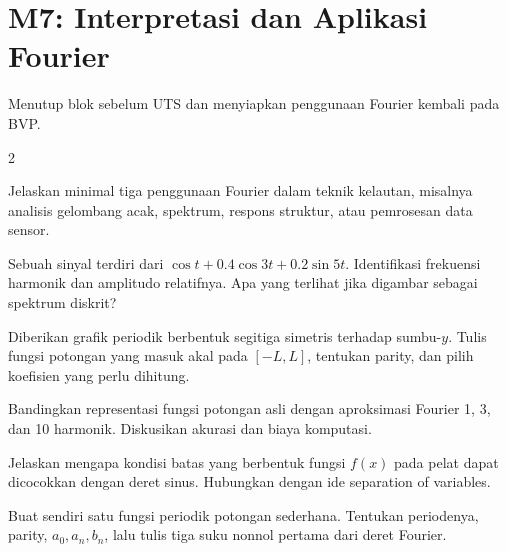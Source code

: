 \documentclass[10pt,a4paper]{article}
\newcommand{\level}[1]{\colorbox{levelbg}{\scriptsize\strut #1}}
\newcommand{\src}[1]{\colorbox{sourcebg}{\scriptsize\strut #1}}
\begin{document}
\section*{M7: Interpretasi dan Aplikasi Fourier}
{\color{iteraGray}\small Menutup blok sebelum UTS dan menyiapkan penggunaan Fourier kembali pada BVP.}\par\vspace{1mm}
\begin{multicols}{2}
\begin{qbox}[title={M7.1: Aplikasi Fourier di Teknik Kelautan\hfill \level{L1}\;\src{PR}}]
\small Jelaskan minimal tiga penggunaan Fourier dalam teknik kelautan, misalnya analisis gelombang acak, spektrum, respons struktur, atau pemrosesan data sensor.
\end{qbox}
\begin{qbox}[title={M7.2: Interpretasi spektrum\hfill \level{L2}\;\src{Var}}]
\small Sebuah sinyal terdiri dari $\cos t+0.4\cos 3t+0.2\sin 5t$. Identifikasi frekuensi harmonik dan amplitudo relatifnya. Apa yang terlihat jika digambar sebagai spektrum diskrit?
\end{qbox}
\begin{qbox}[title={M7.3: Fungsi dari grafik\hfill \level{L3}\;\src{Var}}]
\small Diberikan grafik periodik berbentuk segitiga simetris terhadap sumbu-$y$. Tulis fungsi potongan yang masuk akal pada $[-L,L]$, tentukan parity, dan pilih koefisien yang perlu dihitung.
\end{qbox}
\begin{qbox}[title={M7.4: Bandingkan representasi\hfill \level{L3}\;\src{Var}}]
\small Bandingkan representasi fungsi potongan asli dengan aproksimasi Fourier 1, 3, dan 10 harmonik. Diskusikan akurasi dan biaya komputasi.
\end{qbox}
\begin{qbox}[title={M7.5: Fourier sebagai jembatan ke BVP\hfill \level{L2}\;\src{Var}}]
\small Jelaskan mengapa kondisi batas yang berbentuk fungsi $f(x)$ pada pelat dapat dicocokkan dengan deret sinus. Hubungkan dengan ide separation of variables.
\end{qbox}
\begin{qbox}[title={M7.6: Latihan integrasi UTS\hfill \level{L4}\;\src{Var}}]
\small Buat sendiri satu fungsi periodik potongan sederhana. Tentukan periodenya, parity, $a_0,a_n,b_n$, lalu tulis tiga suku nonnol pertama dari deret Fourier.
\end{qbox}
\end{multicols}
\newpage
\end{document}
